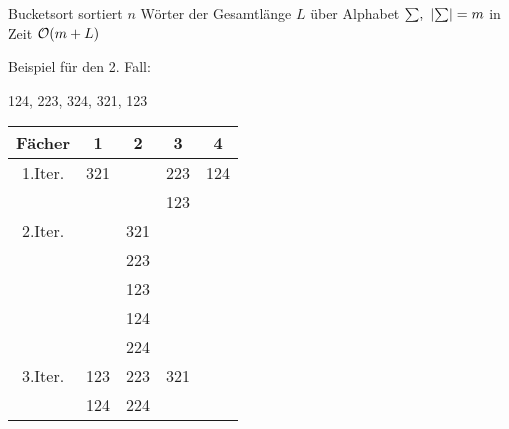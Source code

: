         \begin{satz}
            Bucketsort sortiert $n$ Wörter der Gesamtlänge $L$ über Alphabet $\sum,~\left| \sum \right| = m$ in Zeit $\mathcal{O}(m + L)$
        \end{satz}
        Beispiel für den 2. Fall:        
        \begin{bsp}
            124, 223, 324, 321, 123
            \begin{table}[!htbp]
                \centering
                \begin{tabular}{c|c|c|c|c}
                    Fächer & 1 & 2 & 3 & 4\\
                    \hline
                    1.Iter. & 321 & & 223 & 124\\
                    & & & 123 &\\
                    \hline
                    2.Iter. & & 321 & &\\
                    & & 223 & &\\
                    & & 123 & &\\
                    & & 124 & &\\
                    & & 224 & &\\
                    \hline
                    3.Iter. & 123 & 223 & 321 & \\
                    & 124 & 224 &&
                \end{tabular}
            \end{table}
        \end{bsp}



